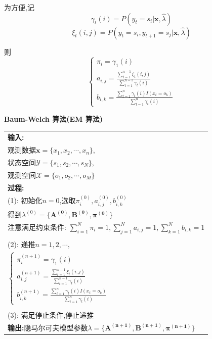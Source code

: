 \documentclass[UTF8,a4paper]{ctexart}%
\begin{document}
            为方便,记
            \[\gamma_t(i) = P(y_t = s_i|\bm{x},\hat{\lambda})\]
            \[\xi_t(i,j) = P(y_t = s_i , y_{t+1} = s_j|\bm{x},\hat{\lambda})\]

            则
            \begin{equation}
              \begin{cases}
                \pi_i = \gamma_1(i)\\
                a_{i,j} = \frac{\sum_{t = 1}^{n-1} \xi_t(i,j)}{\sum_{t = 1}^{n-1} \gamma_t(i)}\\
                b_{i,k} = \frac{\sum_{t = 1}^{n} \gamma_t(i)I(x_t = o_k)}{\sum_{t = 1}^{n} \gamma_t(i)}
              \end{cases}
            \end{equation}

            \textbf{Baum-Welch 算法(EM 算法)}

            \begin{tabular}{l}
              \hline
              \textbf{输入:}\\
              观测数据$\bm{x}=\{x_1,x_2, \cdots , x_n\}$,\\
              状态空间$\mathcal{Y} = \{s_1,s_2,\cdots , s_N\}$,\\
              观测空间$\mathcal{X} = \{o_1,o_2,\cdots , o_M\}$\\
              \textbf{过程:}\\
                (1): 初始化$n = 0$,选取$\pi_i^{(0)},a_{i,j}^{(0)},b_{i,k}^{(0)}$\\
                    得到$\lambda^{(0)} = \{\bm{A^{(0)} , B^{(0)} , \pi^{(0)}}\}$\\
                    注意满足约束条件:
                    $\sum_{i= 1}^N \pi_i = 1,\sum_{j = 1}^N a_{i,j} = 1,\sum_{k = 1}^N b_{i,k} = 1$\\\\
                (2): 递推$n = 1,2,\cdots,$\\
                  $\begin{cases}
                    \pi_i^{(n+1)} = \gamma_1(i)\\
                    a_{i,j}^{(n+1)} = \frac{\sum_{t = 1}^{n-1} \xi_t(i,j)}{\sum_{t = 1}^{n-1} \gamma_t(i)}\\
                    b_{i,k}^{(n+1)} = \frac{\sum_{t = 1}^{n} \gamma_t(i)I(x_t = o_k)}{\sum_{t = 1}^{n} \gamma_t(i)}
                  \end{cases}$\\\\
                (3): 满足停止条件,停止递推\\
              \textbf{输出:}隐马尔可夫模型参数$\lambda = \{\bm{A^{(n+1)},B^{(n+1)},\pi^{(n+1)}}\}$\\
              \hline
            \end{tabular}
\end{document}
